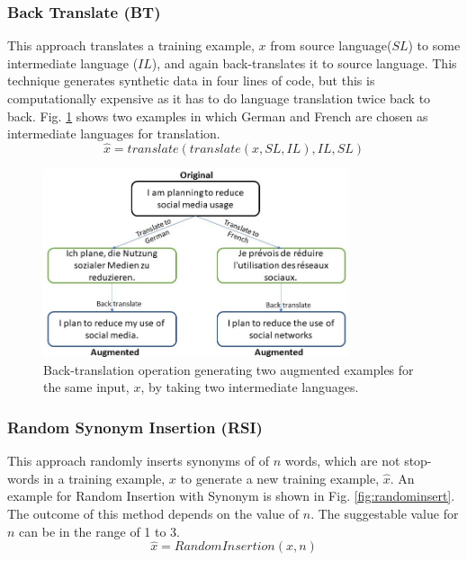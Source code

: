 \documentclass{article}
\begin{document}
\subsubsection{Back Translate (BT)}
This approach translates a training example, $x$ from source language($SL$) to some intermediate language ($IL$), and again back-translates it to source language. This technique generates synthetic data in four lines of code, but this is computationally expensive as it has to do language translation twice back to back. Fig. \ref{fig:backtranslate} shows two examples in which German and French are chosen as intermediate languages for translation.
\begin{equation}
\hat{x} = translate( translate(x, SL, IL), IL, SL)
\end{equation}
\begin{figure}[h!]
\centering
  \includegraphics[width=0.8\textwidth]{backtranslate.jpg}
  \caption{Back-translation operation generating two augmented examples for the same input, $x$, by taking two intermediate languages.}
  \label{fig:backtranslate}
\end{figure}

\subsubsection{Random Synonym Insertion (RSI)}
This approach randomly inserts synonyms of of $n$ words, which are not stop-words in a training example, $x$ to generate a new training example, $\hat{x}$. An example for Random Insertion with Synonym is shown in Fig. \ref{fig:randominsert}. The outcome of this method depends on the value of $n$. The suggestable value for $n$ can be in the range of 1 to 3. 
\begin{equation}
\hat{x} = RandomInsertion(x, n)
\end{equation}
\end{document}
